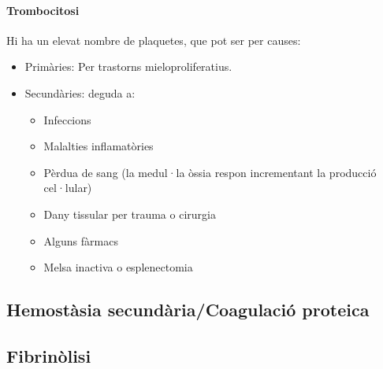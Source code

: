 \paragraph{Trombocitosi}
Hi ha un elevat nombre de plaquetes, que pot ser per causes:
\begin{itemize}
\item Primàries: Per trastorns mieloproliferatius.

\item Secundàries: deguda a:
  \begin{itemize}
  \item Infeccions
  \item Malalties inflamatòries
  \item Pèrdua de sang (la medul·la òssia respon incrementant la
    producció cel·lular)
  \item Dany tissular per trauma o cirurgia
  \item Alguns fàrmacs
  \item Melsa inactiva o esplenectomia
  \end{itemize}
\end{itemize}

\subsection{Hemostàsia secundària/Coagulació proteica}


\subsection{Fibrinòlisi}
